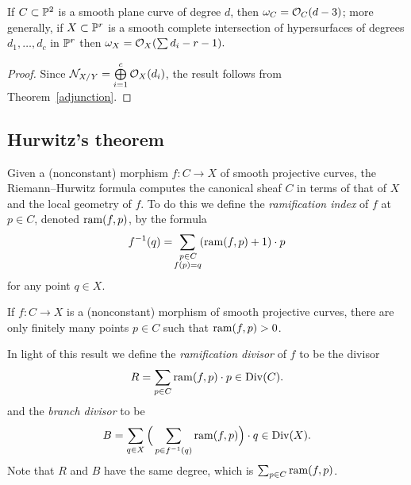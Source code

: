 \begin{corollary}\label{canonical of plane curve}\label{canonical of complete intersection}
If $C\subset \mathbb P^{2}$ is a smooth plane curve of degree $d$, then
$\omega_{C} = {\mathcal O}_{C}(d-\nobreak 3)$; more generally, if
$X\subset \mathbb P^{r}$ is a smooth complete intersection of hypersurfaces of degrees $d_{1},\dots, d_{c}$ in $\mathbb P^r$ then
$\omega_{X} = {\mathcal O}_{X}(\sum d_{i }-r-1).$
\unif
\end{corollary}

\begin{proof}
Since ${\mathcal N}_{X/Y} = \bigoplus\limits_{i=1}^{c} {\mathcal O}_{X}(d_{i})$, the result follows from Theorem~\ref{adjunction}.
\end{proof}

\subsection*{Hurwitz's theorem}
 Given a (nonconstant) morphism $f : C \to X$ of smooth projective
 curves, the Riemann--Hurwitz formula computes the canonical sheaf
 $C$ in terms of that of  $X$ and the local geometry of $f$. To do
 this we define the
%
%
%
\emph{ramification index}
of $f$ at $p \in C$,  denoted $\operatorname{ram}(f,p)$, 
by the formula 
$$
 f^{-1}(q) = \!\sum_{\substack{\kern1ptp\in C\\ f(p)=q}}\! (\operatorname{ram}(f,p)+1)\cdot p
 $$
 for any point $q \in X$. 

\begin{proposition}
If $f : C \to X$ is a (nonconstant) morphism  of smooth projective curves,
there are only finitely many
points $p\in C$ such that $\operatorname{ram}(f,p)>0$.
\unif
\end{proposition}

In light of this result we define the \emph{ramification divisor}
%
of $f$ to be the divisor
 $$
 R = \sum_{p \in C} \operatorname{ram}(f,p)\cdot p \relax \in \relax  \operatorname{Div}(C).
 $$
 and the \emph{branch divisor} to be
%
 $$
 B = \sum_{q \in X} \Big(\sum_{p \in f^{-1}(q)} \operatorname{ram}(f,p) \Big)\cdot q \relax \in \relax \operatorname{Div}(X).
 $$
Note that $R$ and $B$ have the same degree, which is $\sum_{p \in C} \operatorname{ram}(f,p)$.

